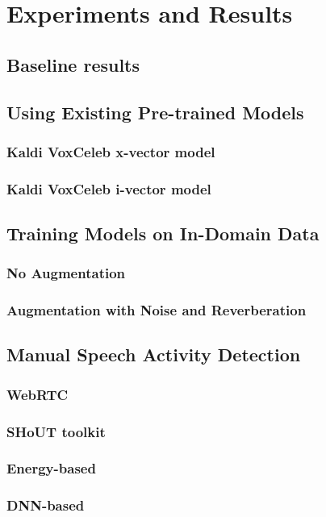 \chapter{Experiments and Results}

	\section{Baseline results}
			
	\section{Using Existing Pre-trained Models}
		\subsection{Kaldi VoxCeleb x-vector model}
		\subsection{Kaldi VoxCeleb i-vector model}
	
	\section{Training Models on In-Domain Data}
		\subsection{No Augmentation}
		\subsection{Augmentation with Noise and Reverberation}
		
	\section{Manual Speech Activity Detection}
		\subsection{WebRTC}
		\subsection{SHoUT toolkit}
		\subsection{Energy-based}
		\subsection{DNN-based}
		
